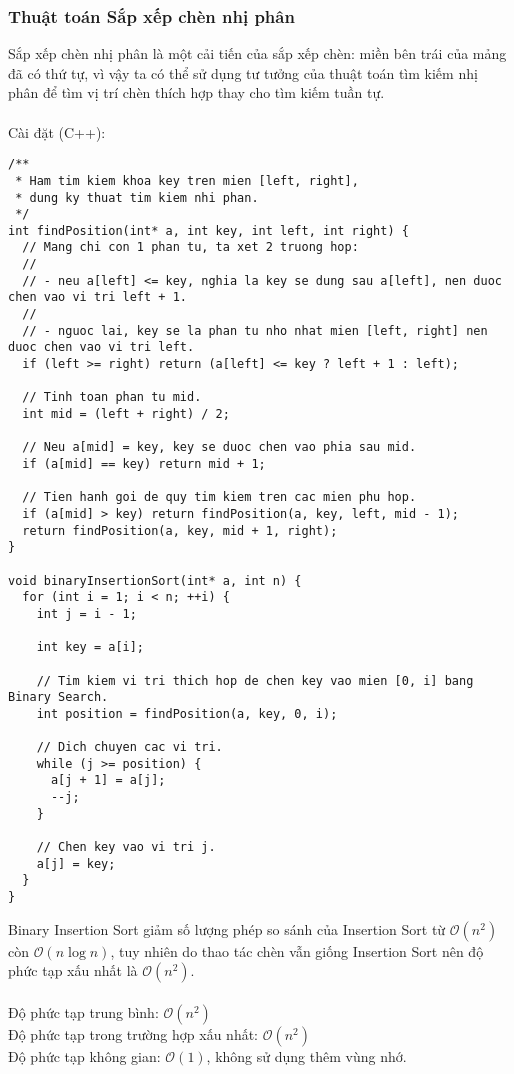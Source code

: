 \documentclass[]{article}
\begin{document}
\subsubsection{Thuật toán Sắp xếp chèn nhị phân}
Sắp xếp chèn nhị phân là một cải tiến của sắp xếp chèn: miền bên trái của mảng đã có thứ tự, vì vậy ta có thể sử dụng tư tưởng của thuật toán tìm kiếm nhị phân để tìm vị trí chèn thích hợp thay cho tìm kiếm tuần tự.
\\\\
Cài đặt (C++):
\begin{lstlisting}
/**
 * Ham tim kiem khoa key tren mien [left, right],
 * dung ky thuat tim kiem nhi phan.
 */
int findPosition(int* a, int key, int left, int right) {
  // Mang chi con 1 phan tu, ta xet 2 truong hop:
  //
  // - neu a[left] <= key, nghia la key se dung sau a[left], nen duoc chen vao vi tri left + 1.
  //
  // - nguoc lai, key se la phan tu nho nhat mien [left, right] nen duoc chen vao vi tri left.
  if (left >= right) return (a[left] <= key ? left + 1 : left);

  // Tinh toan phan tu mid.
  int mid = (left + right) / 2;

  // Neu a[mid] = key, key se duoc chen vao phia sau mid.
  if (a[mid] == key) return mid + 1;

  // Tien hanh goi de quy tim kiem tren cac mien phu hop.
  if (a[mid] > key) return findPosition(a, key, left, mid - 1);
  return findPosition(a, key, mid + 1, right);
}

void binaryInsertionSort(int* a, int n) {
  for (int i = 1; i < n; ++i) {
    int j = i - 1;

    int key = a[i];

    // Tim kiem vi tri thich hop de chen key vao mien [0, i] bang Binary Search.
    int position = findPosition(a, key, 0, i);

    // Dich chuyen cac vi tri.
    while (j >= position) {
      a[j + 1] = a[j];
      --j;
    }

    // Chen key vao vi tri j.
    a[j] = key;
  }
}
\end{lstlisting}Binary Insertion Sort giảm số lượng phép so sánh của Insertion Sort từ $\mathcal{O}(n^2)$ còn $\mathcal{O}(n \log n)$, tuy nhiên do thao tác chèn vẫn giống Insertion Sort nên độ phức tạp xấu nhất là $\mathcal{O}(n^2)$.
\\\\
Độ phức tạp trung bình: $\mathcal{O}(n^2)$
\\
Độ phức tạp trong trường hợp xấu nhất: $\mathcal{O}(n^2)$
\\
Độ phức tạp không gian: $\mathcal{O}(1)$, không sử dụng thêm vùng nhớ.
\end{document}
